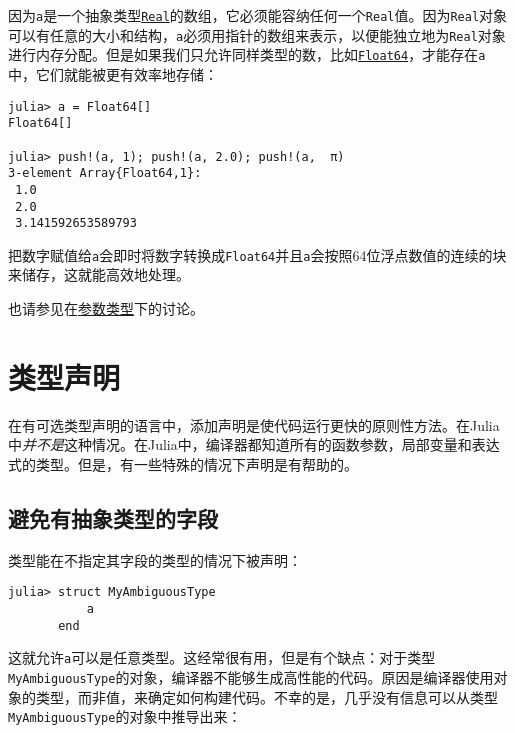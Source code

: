 因为\texttt{a}是一个抽象类型\hyperlink{6175959395021454412}{\texttt{Real}}的数组，它必须能容纳任何一个\texttt{Real}值。因为\texttt{Real}对象可以有任意的大小和结构，\texttt{a}必须用指针的数组来表示，以便能独立地为\texttt{Real}对象进行内存分配。但是如果我们只允许同样类型的数，比如\hyperlink{5027751419500983000}{\texttt{Float64}}，才能存在\texttt{a}中，它们就能被更有效率地存储：




\begin{verbatim}
julia> a = Float64[]
Float64[]

julia> push!(a, 1); push!(a, 2.0); push!(a,  π)
3-element Array{Float64,1}:
 1.0
 2.0
 3.141592653589793
\end{verbatim}



把数字赋值给\texttt{a}会即时将数字转换成\texttt{Float64}并且\texttt{a}会按照64位浮点数值的连续的块来储存，这就能高效地处理。



也请参见在\hyperlink{5603543911318150609}{参数类型}下的讨论。



\hypertarget{11271598028486730305}{}


\section{类型声明}



在有可选类型声明的语言中，添加声明是使代码运行更快的原则性方法。在Julia中\emph{并不是}这种情况。在Julia中，编译器都知道所有的函数参数，局部变量和表达式的类型。但是，有一些特殊的情况下声明是有帮助的。



\hypertarget{17004910976199348766}{}


\subsection{避免有抽象类型的字段}



类型能在不指定其字段的类型的情况下被声明：




\begin{verbatim}
julia> struct MyAmbiguousType
           a
       end
\end{verbatim}



这就允许\texttt{a}可以是任意类型。这经常很有用，但是有个缺点：对于类型\texttt{MyAmbiguousType}的对象，编译器不能够生成高性能的代码。原因是编译器使用对象的类型，而非值，来确定如何构建代码。不幸的是，几乎没有信息可以从类型\texttt{MyAmbiguousType}的对象中推导出来：




